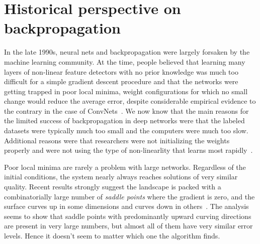 \documentclass[10pts]{article}
\begin{document}




\section{Historical perspective on backpropagation}

In the late 1990s, neural nets and backpropagation were largely
forsaken by the machine learning community. At the time, people
believed that learning many layers of non-linear feature detectors
with no prior knowledge was much too difficult for a simple gradient
descent procedure and that the networks were getting trapped in poor
local minima, weight configurations for which no small change would
reduce the average error, despite considerable empirical evidence to
the contrary in the case of ConvNets~\citep{lecun-98}. We now know
that the main reasons for the limited success of backpropagation in
deep networks were that the labeled datasets were typically much too
small and the computers were much too slow. Additional reasons were
that researchers were not initializing the weights properly and were
not using the type of non-linearlity that learns most
rapidly~\citep{lecun-98b,GlorotAISTATS2010-small}.

Poor local minima are rarely a problem with large networks. Regardless
of the initial conditions, the system nearly always reaches solutions
of very similar quality.  Recent results strongly suggest the
landscape is packed with a combinatorially large number of {\em saddle
  points} where the gradient is zero, and the surface curves up in
some dimensions and curves down in
others~\citep{Dauphin-et-al-NIPS2014-small,Choromanska-et-al-AISTATS2015}.
The analysis seems to show that saddle points with predominantly
upward curving directions are present in very
large numbers, but almost all of them have very similar error levels.
Hence it doesn't seem to matter which one the algorithm
finds. 
\end{document}
